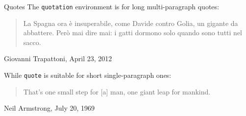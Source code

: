 \begin{frame}{Quotes}
The \texttt{quotation} environment is for long multi-paragraph quotes:

\begin{quotation}
La Spagna ora è insuperabile, come Davide contro Golia, un gigante da abbattere.
Però mai dire mai: i gatti dormono solo quando sono tutti nel sacco.
\end{quotation}

Giovanni Trapattoni, April 23, 2012

\bigskip

While \texttt{quote} is suitable for short single-paragraph ones:

\begin{quote}
That's one small step for [a] man, one giant leap for mankind.
\end{quote}

Neil Armstrong, July 20, 1969
\end{frame}
